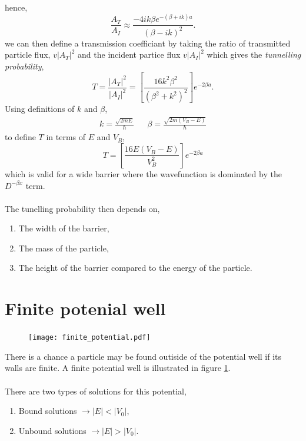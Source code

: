\documentclass{book}
\begin{document}
hence,
\begin{equation}
	\frac{A_T}{A_I} \approx \frac{-4ik\beta e^{-(\beta + ik)a}}{(\beta - ik)^2}.
\end{equation}
we can then define a transmission coefficiant by taking the ratio of transmitted particle flux, $v|A_T|^2$ and the incident partice flux $v|A_I|^2$ which gives the \textit{tunnelling probability},
\begin{equation}
	T = \frac{|A_T|^2}{|A_I|^2} = \left[\frac{16k^2\beta^2}{(\beta^2 + k^2)^2}\right]e^{-2\beta a}.
\end{equation}
Using definitions of $k$ and $\beta$,
\begin{align}
	k = \frac{\sqrt{2mE}}{\hbar} && \beta = \frac{\sqrt{2m(V_B - E)}}{\hbar}
\end{align}
to define $T$ in terms of $E$ and $V_B$,
\begin{equation}
	T = \left[\frac{16E(V_B - E)}{V_B^2}\right] e^{-2\beta a}
\end{equation}
which is valid for a wide barrier where the wavefunction is dominated by the $D^{-\beta x}$ term.
\\\\
The tunelling probability then depends on,
\begin{enumerate}
	\item The width of the barrier,
	\item The mass of the particle,
	\item The height of the barrier compared to the energy of the particle.
\end{enumerate}
\section{Finite potenial well}
\begin{figure}
	\centering 
	\texttt{[image: finite\_potential.pdf]}
	\caption{}
	\label{finitepotential}
\end{figure}
There is a chance a particle may be found outiside of the potential well if its walls are finite. A finite potential well is illustrated in figure \ref{finitepotential}.
\\\\
There are two types of solutions for this potential,
\begin{enumerate}
	\item Bound solutions $\to |E| < |V_0|$,
	\item Unbound solutions $\to |E| > |V_0|$.
\end{enumerate}
\end{document}
